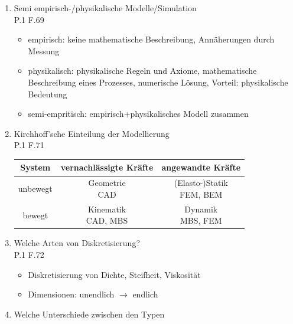 \documentclass[10pt,a4paper,fleqn]{article}
\begin{document}
\begin{enumerate}
\section{Virtuelle Produktentwicklung}
\subsection{CAx - Methoden}
	\item Semi empirisch-/physikalische Modelle/Simulation\\
		P.1 F.69
		\begin{itemize}
			\item empirisch: keine mathematische Beschreibung, Annäherungen durch Messung
			\item physikalisch: physikalische Regeln und Axiome, mathematische Beschreibung eines Prozesses, numerische Lösung, Vorteil: physikalische Bedeutung
			\item semi-empritisch: empirisch+physikalisches Modell zusammen
		\end{itemize}
	\item Kirchhoff'sche Einteilung der Modellierung\\
		P.1 F.71
		\begin{center}
			\begin{tabular}{|c|c|c|}
			\hline 
			System & vernachlässigte Kräfte & angewandte Kräfte \\ 
			\hline 
			unbewegt & \pbox{20cm}{Geometrie\\ CAD} & \pbox{20cm}{(Elasto-)Statik \\ FEM, BEM} \\ 
			\hline
			bewegt & \pbox{20cm}{Kinematik \\ CAD, MBS} & \pbox{20cm}{Dynamik \\  MBS, FEM} \\ 
			\hline 
			\end{tabular} 
		\end{center}
	\item Welche Arten von Diskretisierung?\\
		P.1 F.72
			\begin{itemize}
				\item Diskretisierung von Dichte, Steifheit, Viskosität
				\item Dimensionen: unendlich $\rightarrow$ endlich
			\end{itemize}
	\item Welche Unterschiede zwischen den Typen
	

\end{enumerate}
\end{document}
